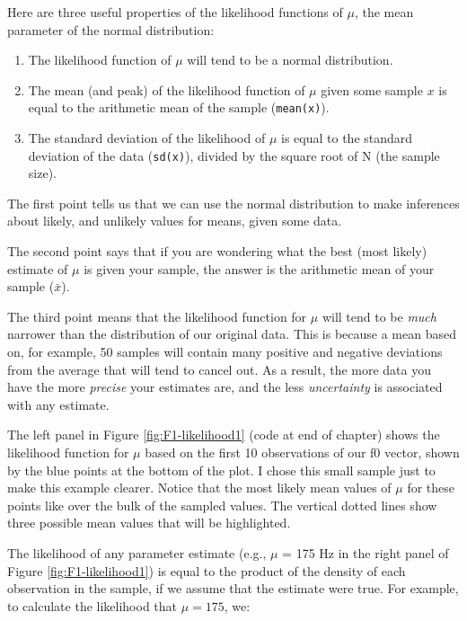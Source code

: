 \documentclass[
]{book}
\begin{document}
Here are three useful properties of the likelihood functions of \(\mu\), the mean parameter of the normal distribution:

\begin{enumerate}
\def\labelenumi{\arabic{enumi}.}
\item
  The likelihood function of \(\mu\) will tend to be a normal distribution.
\item
  The mean (and peak) of the likelihood function of \(\mu\) given some sample \(x\) is equal to the arithmetic mean of the sample (\texttt{mean(x)}).
\item
  The standard deviation of the likelihood of \(\mu\) is equal to the standard deviation of the data (\texttt{sd(x)}), divided by the square root of N (the sample size).
\end{enumerate}

The first point tells us that we can use the normal distribution to make inferences about likely, and unlikely values for means, given some data.

The second point says that if you are wondering what the best (most likely) estimate of \(\mu\) is given your sample, the answer is the arithmetic mean of your sample (\(\bar{x}\)).

The third point means that the likelihood function for \(\mu\) will tend to be \emph{much} narrower than the distribution of our original data. This is because a mean based on, for example, 50 samples will contain many positive and negative deviations from the average that will tend to cancel out. As a result, the more data you have the more \emph{precise} your estimates are, and the less \emph{uncertainty} is associated with any estimate.

The left panel in Figure \ref{fig:F1-likelihood1} (code at end of chapter) shows the likelihood function for \(\mu\) based on the first 10 observations of our f0 vector, shown by the blue points at the bottom of the plot. I chose this small sample just to make this example clearer. Notice that the most likely mean values of \(\mu\) for these points like over the bulk of the sampled values. The vertical dotted lines show three possible mean values that will be highlighted.

The likelihood of any parameter estimate (e.g., \(\mu\) = 175 Hz in the right panel of Figure \ref{fig:F1-likelihood1}) is equal to the product of the density of each observation in the sample, if we assume that the estimate were true. For example, to calculate the likelihood that \(\mu=175\), we:
\end{document}
